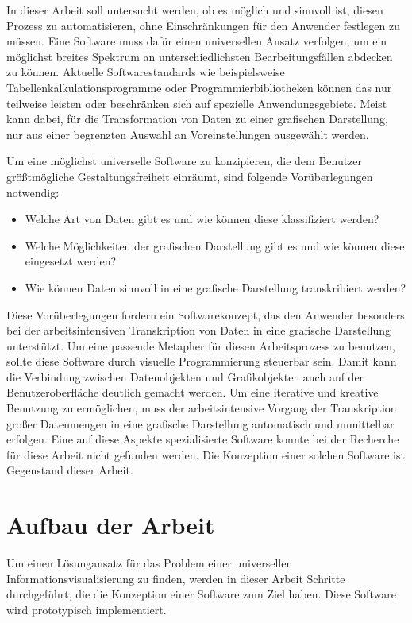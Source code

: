 \documentclass[a4paper, 12pt, DIVcalc, onepage, pdftex, headsepline, footsepline]{scrreprt}
\begin{document}
In dieser Arbeit soll untersucht werden, ob es möglich und sinnvoll ist, diesen Prozess  zu automatisieren,
ohne Einschränkungen für den Anwender festlegen zu müssen.
Eine Software muss dafür einen universellen Ansatz verfolgen, um ein möglichst breites Spektrum an
unterschiedlichsten Bearbeitungsfällen abdecken zu können. 
Aktuelle Softwarestandards wie beispielsweise Tabellenkalkulationsprogramme oder Programmierbibliotheken
können das nur teilweise leisten oder beschränken sich auf spezielle Anwendungsgebiete.
Meist kann dabei, für die Transformation von Daten zu einer grafischen Darstellung, nur
aus einer begrenzten Auswahl an Voreinstellungen ausgewählt werden.

Um eine möglichst universelle Software zu konzipieren, die dem Benutzer größtmögliche
Gestaltungsfreiheit einräumt, sind folgende Vorüberlegungen notwendig:
\begin{itemize}
\item{Welche Art von Daten gibt es und wie können diese klassifiziert werden?}
\item{Welche Möglichkeiten der grafischen Darstellung gibt es und wie können diese eingesetzt werden?}
\item{Wie können Daten sinnvoll in eine grafische Darstellung transkribiert werden?}
\end{itemize}
Diese Vorüberlegungen fordern ein Softwarekonzept, das den Anwender besonders bei der 
arbeitsintensiven Transkription
von Daten in eine grafische Darstellung unterstützt. Um eine passende Metapher für diesen Arbeitsprozess zu benutzen,
sollte diese Software durch visuelle Programmierung steuerbar sein. Damit kann die Verbindung zwischen Datenobjekten
und Grafikobjekten auch auf der Benutzeroberfläche deutlich gemacht werden.
Um eine iterative und kreative Benutzung zu ermöglichen, muss der arbeitsintensive Vorgang
der Transkription großer Datenmengen in eine grafische Darstellung
automatisch und unmittelbar erfolgen.
Eine auf diese Aspekte spezialisierte Software konnte bei der
Recherche für diese Arbeit nicht gefunden werden. Die Konzeption einer solchen Software ist Gegenstand dieser Arbeit.
\section{Aufbau der Arbeit}
Um einen Lösungansatz für das Problem einer universellen Informationsvisualisierung
zu finden, werden in dieser Arbeit Schritte durchgeführt, die die Konzeption einer Software zum Ziel haben.
Diese Software wird prototypisch implementiert.
\end{document}
